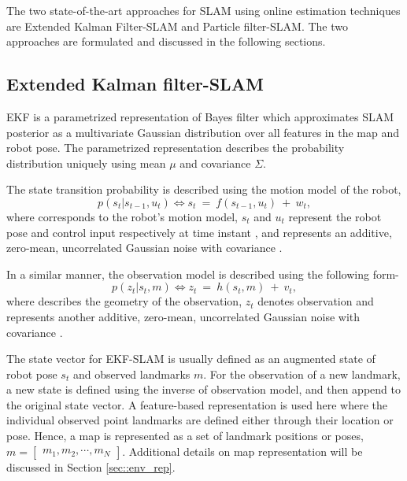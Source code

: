 The two state-of-the-art approaches for SLAM using online estimation techniques are Extended Kalman Filter-SLAM and Particle filter-SLAM. The two approaches are formulated and discussed in the following sections.

\subsection{Extended Kalman filter-SLAM} \label{sec::ekfslam}
\acf{EKF} is a parametrized representation of Bayes filter which approximates SLAM posterior as a multivariate Gaussian distribution over all features in the map and robot pose. The parametrized representation describes the probability distribution uniquely using mean $\mu$ and covariance $\Sigma$.

The state transition probability is described using the motion model of the robot,
\begin{equation}
p(s_t|s_{t-1},u_t)\Longleftrightarrow s_t~=~f(s_{t-1},u_t)~+~w_t,
\end{equation}
where  corresponds to the robot's motion model, $s_t$ and $u_t$ represent the robot pose and control input respectively at time instant , and  represents an additive, zero-mean, uncorrelated Gaussian noise with covariance .

In a similar manner, the observation model is described using the following form-
\begin{equation}
p(z_t|s_t,m)\Longleftrightarrow z_t~=~h(s_t,m)~+~v_t,
\end{equation}
where  describes the geometry of the observation, $z_t$ denotes observation and  represents another additive, zero-mean, uncorrelated Gaussian noise with covariance .

The state vector for EKF-SLAM  is usually defined as an augmented state of robot pose $s_t$ and observed landmarks $m$. For the observation of a new landmark, a new state is defined using the inverse of observation model, and then append to the original state vector. A feature-based representation is used here where the individual observed point landmarks are defined either through their location or pose. Hence, a map is represented as a set of landmark positions or poses, $m=\begin{bmatrix}m_1, m_2, \cdots, m_N\end{bmatrix}$. Additional details on map representation will be discussed in Section \ref{sec::env_rep}.

